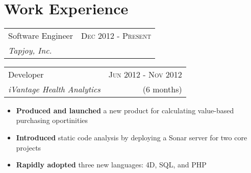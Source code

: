 \documentclass[10pt]{article} %
\begin{document}
\color{text1} %


\par{\\ %


\begin{minipage}[t]{0.5\textwidth}
\vspace{0pt} %


\section{Work Experience}


\begin{tabularx}{\linewidth}{ X r }
  {\large Software Engineer } & {\textsc{Dec 2012 - Present}} \\
  {\small\textit{Tapjoy, Inc.}}
\end{tabularx}

\begin{itemize}
\end{itemize}


\begin{tabularx}{\linewidth}{ X r }
  {\large Developer } & {\textsc{Jun 2012 - Nov 2012}} \\
  {\small\textit{iVantage Health Analytics}} & {\small{(6 months)}}
\end{tabularx}

\begin{itemize}
  \item \textbf{Produced and launched} a new product for calculating value-based purchasing oportinities
  \item \textbf{Introduced} static code analysis by deploying a Sonar server for two core projects
  \item \textbf{Rapidly adopted} three new languages: 4D, SQL, and PHP
\end{itemize}


\end{minipage}}
\end{document}
